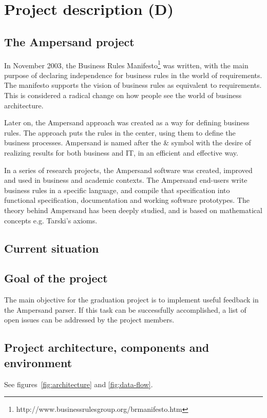 \section{Project description (D)}
\label{sec:project-description}

\subsection{The Ampersand project}
In November 2003, the Business Rules Manifesto\footnote{http://www.businessrulesgroup.org/brmanifesto.htm} was written, with the main purpose of declaring independence for business rules in the world of requirements.
The manifesto supports the vision of business rules as equivalent to requirements.
This is considered a radical change on how people see the world of business architecture.

Later on, the Ampersand approach was created as a way for defining business rules.
The approach puts the rules in the center, using them to define the business processes.
Ampersand is named after the \& symbol with the desire of realizing results for both business and IT, in an efficient and effective way.

In a series of research projects, the Ampersand software was created, improved and used in business and academic contexts.
The Ampersand end-users write business rules in a specific language, and compile that specification into functional specification, documentation and working software prototypes.
The theory behind Ampersand has been deeply studied, and is based on mathematical concepts e.g. Tarski's axioms.

\subsection{Current situation}


\subsection{Goal of the project}
The main objective for the graduation project is to implement useful feedback in the Ampersand parser.
If this task can be successfully accomplished, a list of open issues can be addressed by the project members.

\subsection{Project architecture, components and environment}
See figures~\ref{fig:architecture} and \ref{fig:data-flow}.

